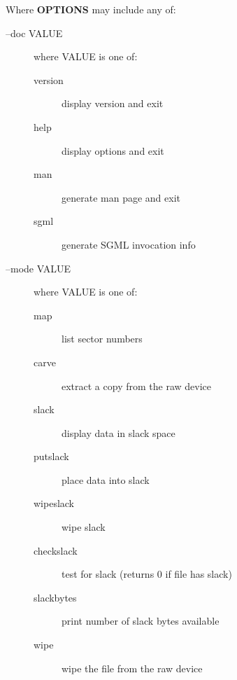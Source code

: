\documentclass[letterpaper]{article}
\begin{document}
Where {\bfseries OPTIONS} may include any of:
\begin{description}
\item[--doc VALUE] \mbox{}

where VALUE is one of:
\begin{description}
\item[version] \mbox{}

display version and exit

\item[help] \mbox{}

display options and exit

\item[man] \mbox{}

generate man page and exit

\item[sgml] \mbox{}

generate SGML invocation info

\end{description}


\item[--mode VALUE] \mbox{}

where VALUE is one of:
\begin{description}
\item[map] \mbox{}

list sector numbers

\item[carve] \mbox{}

extract a copy from the raw device

\item[slack] \mbox{}

display data in slack space

\item[putslack] \mbox{}

place data into slack

\item[wipeslack] \mbox{}

wipe slack

\item[checkslack] \mbox{}

test for slack (returns 0 if file has slack)

\item[slackbytes] \mbox{}

print number of slack bytes available

\item[wipe] \mbox{}

wipe the file from the raw device


\end{description}
\end{description}
\end{document}

